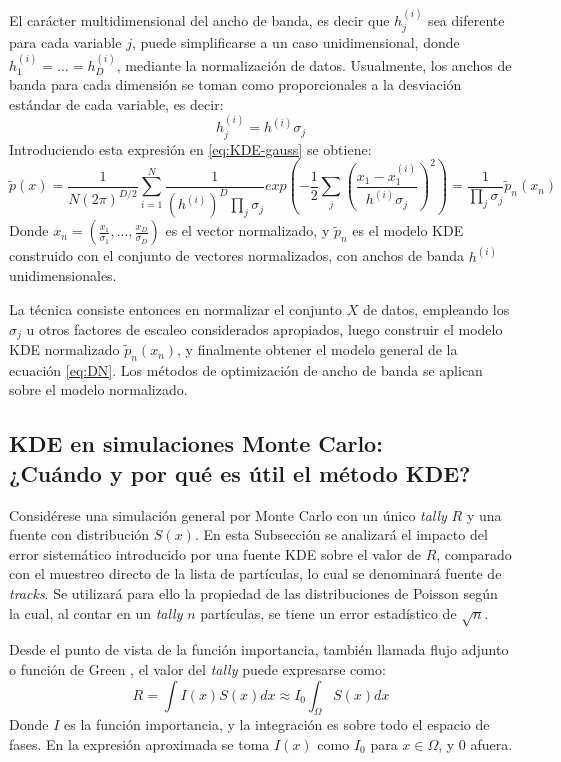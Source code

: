 El carácter multidimensional del ancho de banda, es decir que $h_j^{(i)}$ sea diferente para cada variable $j$, puede simplificarse a un caso unidimensional, donde $h_1^{(i)}=...=h_D^{(i)}$, mediante la normalización de datos. Usualmente, los anchos de banda para cada dimensión se toman como proporcionales a la desviación estándar de cada variable, es decir:
\begin{equation}
    h_j^{(i)} = h^{(i)} \sigma_j
\end{equation}
Introduciendo esta expresión en \ref{eq:KDE-gauss} se obtiene:
\begin{equation}
    \label{eq:DN}
    \tilde{p}(x) = \frac{1}{N (2\pi)^{D/2}} \sum_{i=1}^N \frac{1}{(h^{(i)})^D\prod_j \sigma_j} exp\left(-\frac{1}{2} \sum_j \left(\frac{x_1-x_1^{(i)}}{h^{(i)}\sigma_j}\right)^2\right)
    = \frac{1}{\prod_j \sigma_j} \tilde{p}_n(x_n)
\end{equation}
Donde $x_n=(\frac{x_1}{\sigma_1},...,\frac{x_D}{\sigma_D})$ es el vector normalizado, y $\tilde{p}_n$ es el modelo KDE construido con el conjunto de vectores normalizados, con anchos de banda $h^{(i)}$ unidimensionales.

La técnica consiste entonces en normalizar el conjunto $X$ de datos, empleando los $\sigma_j$ u otros factores de escaleo considerados apropiados, luego construir el modelo KDE normalizado $\tilde{p}_n(x_n)$, y finalmente obtener el modelo general de la ecuación \ref{eq:DN}. Los métodos de optimización de ancho de banda se aplican sobre el modelo normalizado.


\subsection[KDE en simulaciones Monte Carlo: ¿Cuándo y por qué es útil el método KDE?]{KDE en simulaciones Monte Carlo:\\¿Cuándo y por qué es útil el método KDE?}
\label{ssec:KDE-MC}

Considérese una simulación general por Monte Carlo con un único \emph{tally} $R$ y una fuente con distribución $S(x)$. En esta Subsección se analizará el impacto del error sistemático introducido por una fuente KDE sobre el valor de $R$, comparado con el muestreo directo de la lista de partículas, lo cual se denominará fuente de \emph{tracks}. Se utilizará para ello la propiedad de las distribuciones de Poisson según la cual, al contar en un \emph{tally} $n$ partículas, se tiene un error estadístico de $\sqrt{n}$.

Desde el punto de vista de la función importancia, también llamada flujo adjunto o función de Green \cite{AF}, el valor del \emph{tally} puede expresarse como:
\begin{equation}
    \label{eq:R}
    R = \int I(x) S(x) dx \approx I_0 \int_{\Omega} S(x) dx
\end{equation}
Donde $I$ es la función importancia, y la integración es sobre todo el espacio de fases. En la expresión aproximada se toma $I(x)$ como $I_0$ para $x \in \Omega$, y 0 afuera.

